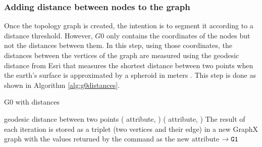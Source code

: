 \subsubsection{Adding distance between nodes to the graph}
Once the topology graph is created, the intention is to segment it according to a distance threshold. However, $G0$ only contains the coordinates of the nodes but not the distances between them. In this step, using those coordinates, the distances between the vertices of the graph are measured using the geodesic distance from Esri that measures the shortest distance between two points when the earth's surface is approximated by a spheroid in meters \cite{geodesic}. This step is done as shown in Algorithm \ref{alg:g0distances}. 
\begin{algorithm}[H]
	\caption{G0 with distances} \label{alg:g0distances}
	\begin{algorithmic}[1]
	\Statex
	    \State \Return geodesic distance between two points
	    \EndFunction
	    \Statex
	        \State {}
	        \State {}
    		    \State {}
    		    \State \Return ( attribute, )
    		 \Else
    		    \State {}
    		        \State {}
    		    \EndIf
    		    \State {}
    		    \State \Return ( attribute, )
             \EndIf    		 
		\EndFor
		\State The result of each iteration is stored as a triplet (two vertices and their edge) in a new GraphX graph with the values returned by the \Return command as the new  attribute $\rightarrow \texttt{G1}$
	\end{algorithmic} 
\end{algorithm}

